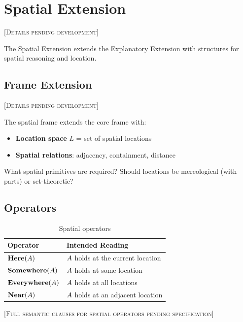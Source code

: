 \documentclass[../LogosReference.tex]{subfiles}
\begin{document}

\section{Spatial Extension}\label{sec:spatial}

\textsc{[Details pending development]}

The Spatial Extension extends the Explanatory Extension with structures for spatial reasoning
and location.


\subsection{Frame Extension}\label{sec:spatial-frame}

\textsc{[Details pending development]}

The spatial frame extends the core frame with:
\begin{itemize}
  \item \textbf{Location space} $L$ = set of spatial locations
  \item \textbf{Spatial relations}: adjacency, containment, distance
\end{itemize}

\begin{question}
What spatial primitives are required?
Should locations be mereological (with parts) or set-theoretic?
\end{question}


\subsection{Operators}\label{sec:spatial-operators}

\begin{table}[h]
\centering
\begin{tabular}{ll}
\toprule
\textbf{Operator} & \textbf{Intended Reading} \\
\midrule
$\textbf{Here}(A)$ & $A$ holds at the current location \\
$\textbf{Somewhere}(A)$ & $A$ holds at some location \\
$\textbf{Everywhere}(A)$ & $A$ holds at all locations \\
$\textbf{Near}(A)$ & $A$ holds at an adjacent location \\
\bottomrule
\end{tabular}
\caption{Spatial operators}
\label{tab:spatial-operators}
\end{table}

\textsc{[Full semantic clauses for spatial operators pending specification]}
\end{document}
